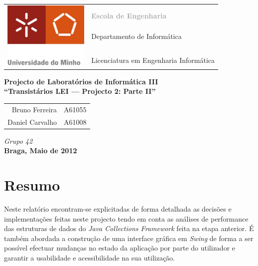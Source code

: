 \documentclass[a5paper,twocolumn, 11pt]{article}
\begin{document}
\onecolumn
\thispagestyle{empty}
\begin{tabular}{ll}
    \multirow{7}{*}{ \includegraphics[height=90pt]{logo.jpeg} }
    &\\
    & \textcolor{DarkGray}{\Large{\textbf{Escola de Engenharia}}} \\
    &\\
    & \large{Departamento de Informática}\\
    &\\
    &\\
    & \large{Licenciatura em Engenharia Informática}\\
\end{tabular}
\begin{center}
    \Large{\textbf{Projecto de Laboratórios de Informática III}}\\
    \vspace{20pt}
    \Large{\textbf{``Transistários LEI --- Projecto 2: Parte II''}}\\
    \vspace{15pt}
    \begin{tabular}{r@{, }l}
        Bruno Ferreira&A61055\\
        Daniel Carvalho&A61008\\
    \end{tabular}
    
    \vspace{5pt}
    \emph{Grupo 42}\\\vspace{15pt}
    \large{\textbf{Braga, Maio de 2012}}
\end{center}

\newpage
\twocolumn
\tableofcontents
\newpage
\listoffigures

\newpage
\section{Resumo}
Neste relatório encontram-se explicitadas de forma detalhada as decisões e implementações feitas neste projecto tendo em conta as análises de performance das estruturas de dados do \textit{Java Collections Framework} feita na etapa anterior. É também abordada a construção de uma interface gráfica em \textit{Swing} de forma a ser possível efectuar mudanças no estado da aplicação por parte do utilizador e garantir a usabilidade e acessibilidade na sua utilização.
\end{document}
